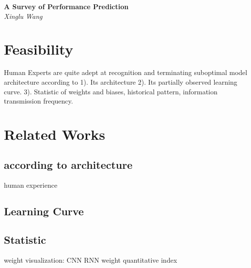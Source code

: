 \documentclass{mcmthesis}
\begin{document}
\begin{center}
	\textbf{\LARGE{A Survey of Performance Prediction}} \\
	\vspace{1em}
	{\itshape Xinglu Wang} %
\end{center}

\section{Feasibility}
Human Experts are quite adept at recognition and terminating suboptimal model architecture according to 1). Its architecture 2). Its partially observed learning curve. 3). Statistic of weights and biases, historical pattern, information transmission frequency. 

\section{Related Works} 
\subsection{according to architecture}
human experience 

\subsection{Learning Curve}

\subsection{Statistic}
weight visualization: %
CNN
RNN 
weight  quantitative index
 





	
\end{document}
